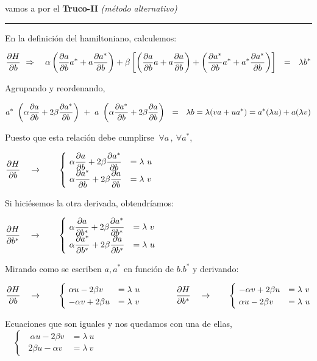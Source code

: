 \vspace{5mm}
vamos a por el \textbf{Truco-II} \emph{(método alternativo)} $\quad$ \rule{200pt}{0.1pt}

En la definición del hamiltoniano, calculemos:

$\displaystyle \pdv{H}{b} \ \Rightarrow \quad \alpha \left( \pdv{a}{b} a^*+a\pdv{a^*}{b} \right) + \beta \left[ \left( \pdv{a}{b} a + a \pdv{a}{b} \right) +  \left( \pdv{a^*}{b} a^* + a^* \pdv{a^*}{b} \right) \right] \ \ = \ \ \lambda b^*$

Agrupando y reordenando,

$\displaystyle a^* \ \left( \alpha \pdv{a}{b} + 2\beta \pdv{a^*}{b} \right) \ + \ a \ \left( \alpha \pdv{a^*}{b}+2\beta \pdv{a}{b} \right) \ \ = \ \ \lambda b= \lambda (va+ua^*)=a^*(\lambda u)+a(\lambda v)$

Puesto que esta relación debe cumplirse $\ \forall a\, , \ \forall a^*$,

$\displaystyle \pdv{H}{b} \quad \to \qquad \begin{cases}  \ \displaystyle \alpha \pdv{a}{b} + 2\beta \pdv{a^*}{b} &=\lambda \ u \\ \ \displaystyle \alpha \pdv{a^*}{b}+2\beta \pdv{a}{b}  &=\lambda \ v  \end{cases}$

Si hiciésemos la otra derivada, obtendríamos:

$\displaystyle \pdv{H}{b^*} \quad \to \qquad \begin{cases}  \ \displaystyle \alpha \pdv{a}{b^*} + 2\beta \pdv{a^*}{b^*} &=\lambda \ v \\ \ \displaystyle \alpha \pdv{a^*}{b^*}+2\beta \pdv{a}{b^*}  &=\lambda \ u  \end{cases}$

Mirando como se escriben $a,a^*$ en función de $b.b^*$ y derivando:

$\displaystyle \pdv{H}{b} \quad \to \qquad \begin{cases}  \ \displaystyle \alpha u - 2\beta v &=\lambda \ u \\ \ \displaystyle -\alpha v +2\beta u  &=\lambda \ v \end{cases}
\qquad \qquad
\displaystyle \pdv{H}{b^*} \quad \to \qquad \begin{cases}  \ \displaystyle -\alpha v + 2\beta u &=\lambda \ v \\ \ \displaystyle \alpha u -2\beta v  &=\lambda \ u \end{cases}$

Ecuaciones que son iguales y nos quedamos con una de ellas, $ \quad \begin{cases} \ \ \ \alpha u - 2\beta v &=\lambda \ u \\ \ \ 2\beta u -\alpha v  &=\lambda \ v \end{cases}$

